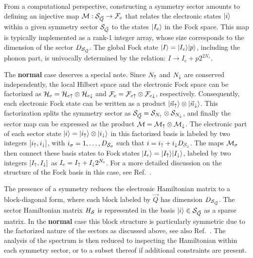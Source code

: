 \documentclass[edipack_sp.tex]{subfiles}
\begin{document}
From a computational perspective, constructing a symmetry
sector amounts to defining an injective map
${\cal M}:{\cal S}_{\vec{Q}}\rightarrow {\cal F}_e$ that relates the electronic states $|i\rangle$
within a given symmetry sector ${\cal S}_{\vec{Q}}$ to the states $|I_e\rangle$ in the Fock space.
This map is typically implemented as a rank-1
integer array, whose size corresponds to the dimension of the sector $D_{{\cal S}_{\vec{Q}}}$. 
The global Fock state $|I\rangle=|I_e\rangle|p\rangle$, including the phonon part, is univocally determined by the relation: $I\to I_e + p 2^{2 N_s}$.


The {\bf normal} case deserves a special note. Since $N_\uparrow$ and
$N_\downarrow$ are conserved independently, the local Hilbert
space and the electronic Fock space can be factorized as
${\cal H}_e={\cal H}_{e\uparrow}\otimes{\cal H}_{e\downarrow}$ and ${\cal F}_\mathrm{e} = {\cal F}_{e\uparrow}\otimes {\cal F}_{e\downarrow}$, respectively.  
Consequently, each electronic Fock state can be written as a product $|\vec{n}_\uparrow\rangle\otimes |\vec{n}_\downarrow\rangle$. This factorization splits the
symmetry sector as ${\cal S}_{\vec{Q}} = {\cal S}_{N_\uparrow}\otimes{\cal S}_{N_\downarrow}$,
and finally the sector map can be expressed as the product ${\cal M} = {\cal M}_\uparrow
\otimes {\cal M}_\downarrow$.
%
The electronic part of each sector state $|i\rangle=|i_\uparrow\rangle \otimes |i_\downarrow\rangle$ in this factorized basis
is labeled by two integers $[i_\uparrow,i_\downarrow]$, with 
$i_\sigma=1,\dots,D_{{\cal S}_\sigma}$ such that $i=i_\uparrow + i_\downarrow
D_{{\cal S}_\downarrow}$.
The maps ${\cal M}_\sigma$ then connect these basis states to Fock states
$|I_e\rangle=|I_\uparrow\rangle|I_\downarrow\rangle$, labeled by two integers
$[I_\uparrow,I_\downarrow]$ as $I_e=I_\uparrow +   I_\downarrow 2^{N_\mathrm{s}}$.
For a more detailed discussion on the structure of the Fock basis in this case, see Ref.~\cite{Amaricci2022}. 

The presence of a symmetry reduces the electronic Hamiltonian matrix to
a block-diagonal form, where each block labeled by $\vec{Q}$ has dimension
$D_{{\cal S}_{\vec{Q}}}$. The sector Hamiltonian matrix $H_{\cal S}$ is represented in the
basis $|i\rangle\in{\cal S}_{\vec{Q}}$ as a sparse matrix.
In the {\bf normal} case this block structure is particularly
symmetric due to the factorized nature of the sectors as discussed
above, see also Ref.~\cite{Amaricci2022}.
The analysis of the spectrum is then reduced to inspecting the
Hamiltonian within each symmetry sector, or to a subset thereof if
additional constraints are present.


\end{document}
